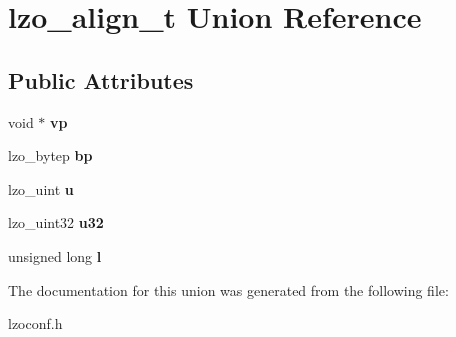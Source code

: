 \hypertarget{unionlzo__align__t}{\section{lzo\-\_\-align\-\_\-t \-Union \-Reference}
\label{unionlzo__align__t}
}
\subsection*{\-Public \-Attributes}
\begin{DoxyCompactItemize}
\item 
\hypertarget{unionlzo__align__t_ae0ef57894c46693ff9065e2b75ece920}{void $\ast$ {\bfseries vp}}\label{unionlzo__align__t_ae0ef57894c46693ff9065e2b75ece920}

\item 
\hypertarget{unionlzo__align__t_aac773bad40693bcf151fdd01b0eb3117}{lzo\-\_\-bytep {\bfseries bp}}\label{unionlzo__align__t_aac773bad40693bcf151fdd01b0eb3117}

\item 
\hypertarget{unionlzo__align__t_a6d5fc8f6421a33e11613fb24f18e3365}{lzo\-\_\-uint {\bfseries u}}\label{unionlzo__align__t_a6d5fc8f6421a33e11613fb24f18e3365}

\item 
\hypertarget{unionlzo__align__t_a8241b503e9e79dbb6493be7eb544d93b}{lzo\-\_\-uint32 {\bfseries u32}}\label{unionlzo__align__t_a8241b503e9e79dbb6493be7eb544d93b}

\item 
\hypertarget{unionlzo__align__t_a62eeb2a3800f16658b959d975d7e2039}{unsigned long {\bfseries l}}\label{unionlzo__align__t_a62eeb2a3800f16658b959d975d7e2039}

\end{DoxyCompactItemize}


\-The documentation for this union was generated from the following file\-:\begin{DoxyCompactItemize}
\item 
lzoconf.\-h\end{DoxyCompactItemize}
